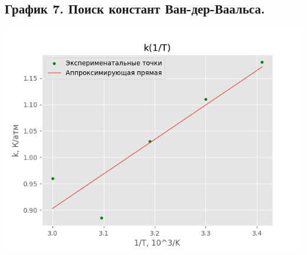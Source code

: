\documentclass[15pt,a5paper,reqno]{article}
\begin{document}
    \subsection{График 7. Поиск констант Ван-дер-Ваальса.}
    \begin{center}
        \includegraphics[width=\textwidth]{Van_der_Waals.png}
    \end{center}
\end{document}
